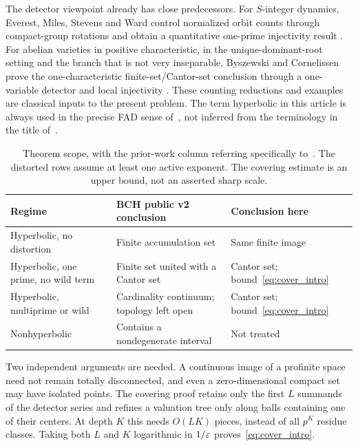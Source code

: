 The detector viewpoint already has close predecessors. For $S$-integer
dynamics, Everest, Miles, Stevens and Ward control normalized orbit counts
through compact-group rotations and obtain a quantitative one-prime
injectivity result \cite[Theorem 1.1, Lemma 2.4 and Corollary 2.5]{emsw2007}.
For abelian varieties in positive characteristic, in the
unique-dominant-root setting and the branch that is not very inseparable,
Byszewski and Cornelissen prove the one-characteristic finite-set/Cantor-set
conclusion through a one-variable detector and local injectivity
\cite[Proposition 9.4 and Theorem 9.5]{bc2018}.
These counting reductions and examples are classical inputs to the present
problem. The term hyperbolic in this article is always used in the precise
FAD sense of~\cite[Definition 10.3.9]{bch2024}, not inferred from the
terminology in the title of~\cite{emsw2007}.

\begin{table}[t]
\centering
\small
\begin{tabularx}{\textwidth}{@{}p{}XX@{}}
\toprule
Regime & BCH public v2 conclusion & Conclusion here\\
\midrule
Hyperbolic, no distortion & Finite accumulation set & Same finite image\\
Hyperbolic, one prime, no wild term & Finite set united with a Cantor set
  & Cantor set; bound~\eqref{eq:cover_intro}\\
Hyperbolic, multiprime or wild & Cardinality continuum; topology left open
  & Cantor set; bound~\eqref{eq:cover_intro}\\
Nonhyperbolic & Contains a nondegenerate interval & Not treated\\
\bottomrule
\end{tabularx}
\caption{Theorem scope, with the prior-work column referring specifically
to~\cite[Theorems 12.5.1--12.5.2 and Problem 14.1.1]{bch2024}.
The distorted rows assume at least one active exponent. The covering
estimate is an upper bound, not an asserted sharp scale.}
\label{tab:scope}
\end{table}

Two independent arguments are needed. A continuous image of a profinite
space need not remain totally disconnected, and even a zero-dimensional
compact set may have isolated points. The covering proof retains only the
first $L$ summands of the detector series and refines a valuation tree only
along balls containing one of their centers. At depth $K$ this needs
$O(LK)$ pieces, instead of all $p^K$ residue classes. Taking both $L$ and
$K$ logarithmic in $1/\varepsilon$ proves~\eqref{eq:cover_intro}.


